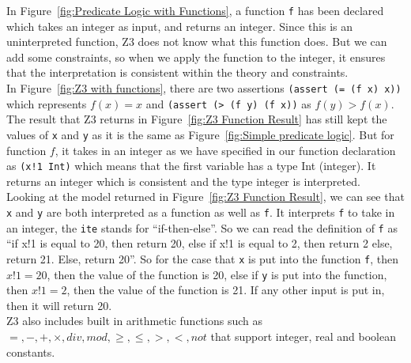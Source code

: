 \documentclass[a4paper]{report}
\begin{document}
In Figure~\ref{fig:Predicate Logic with Functions}, a function \texttt{f} has been declared which takes an integer as input, and returns an integer. Since this is an uninterpreted function, Z3 does not know what this function does. But we can add some constraints, so when we apply the function to the integer, it ensures that the interpretation is consistent within the theory and constraints. \\

In Figure~\ref{fig:Z3 with functions}, there are two assertions \texttt{(assert (= (f x) x))} which represents $f(x) = x$ and \texttt{(assert (> (f y) (f x))} as $f(y) > f(x)$. The result that Z3 returns in Figure~\ref{fig:Z3 Function Result} has still kept the values of \texttt{x} and \texttt{y} as it is the same as Figure~\ref{fig:Simple predicate logic}. But for function $f$, it takes in an integer as we have specified in our function declaration as \texttt{(x!1 Int)} which means that the first variable has a type Int (integer). It returns an integer which is consistent and the type integer is interpreted. \\

Looking at the model returned in Figure~\ref{fig:Z3 Function Result}, we can see that \texttt{x} and \texttt{y} are both interpreted as a function as well as \texttt{f}. It interprets \texttt{f} to take in an integer, the \texttt{ite} stands for ``if-then-else''. So we can read the definition of \texttt{f} as ``if x!1 is equal to 20, then return 20, else if x!1 is equal to 2, then return 2 else, return 21. Else, return 20''. So for the case that \texttt{x} is put into the function \texttt{f}, then $x!1 = 20$, then the value of the function is 20, else if \texttt{y} is put into the function, then $x!1 = 2$, then the value of the function is 21. If any other input is put in, then it will return 20. \\

Z3 also includes built in arithmetic functions such as $=, -, +, \times, div, mod, \geq, \leq, >, <, not$ that support integer, real and boolean constants. \\
\end{document}
